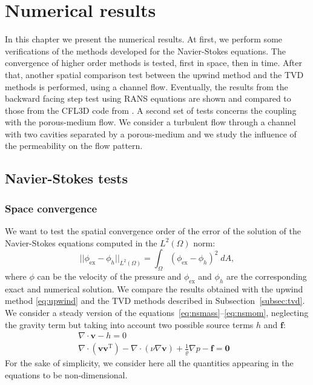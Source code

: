 \chapter{Numerical results} \label{chap:results}
In this chapter we present the numerical results.
At first, we perform some verifications of the methods developed for the Navier-Stokes equations.
The convergence of higher order methods is tested, first in space, 
then in time. After that, another spatial comparison test between the upwind 
method 
and the TVD methods is performed, using a channel flow. Eventually, the results 
from the backward facing step test using RANS equations are shown and 
compared to those from the CFL3D code from \cite{web:nasa}. 
A second set of tests concerns the coupling with the porous-medium flow. We consider a turbulent flow through a channel with two cavities separated by a porous-medium and we study the influence of the permeability on the flow pattern.
%
%
\section{Navier-Stokes tests}
\subsection{Space convergence} \label{subsec:conv}
We want to test the spatial convergence order of the error of the 
solution of the Navier-Stokes equations computed in the $L^2(\Omega)$ norm:
\begin{equation}
	|\!|\phi_\text{ex} - \phi_h|\!|_{L^2(\Omega)} = \int_{\Omega} 
	(\phi_\text{ex} - 
	\phi_h)^2 \; dA,
\end{equation}
where $\phi$ can be the velocity of the pressure and $\phi_\text{ex}$ and 
$\phi_h$ 
are the corresponding exact and numerical solution.
We compare the results obtained with 
the upwind method \eqref{eq:upwind} and the TVD methods described in 
Subsection~\ref{subsec:tvd}.\\
We consider a steady version of the 
equations~\eqref{eq:nsmass}--\eqref{eq:nsmom}, neglecting the gravity term but taking into account two possible source terms $h$ and $\mathbf{f}$:
\begin{align}
	\label{eq:nssteadymass} \nabla \cdot \mathbf{v} -h = 0&\\
	\label{eq:nssteadymom} \nabla \cdot (\mathbf{v} \mathbf{v}^\mathrm{T}) - 
	\nabla \cdot (\nu \nabla \mathbf{v}) + \frac{1}{\varrho}\nabla p  
	-\mathbf{f} = \mathbf{0}&
\end{align}
For the sake of simplicity, we consider here 
all the quantities appearing in the equations to be non-dimensional.
%

